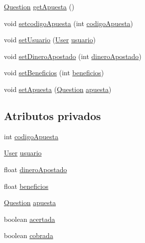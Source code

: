 \begin{DoxyCompactItemize}
\item 
\mbox{\hyperlink{classdomain_1_1Question}{Question}} \mbox{\hyperlink{classdomain_1_1Apuesta_aa9aa7f1a5d45ecec091814d68d4ab5c8}{get\+Apuesta}} ()
\item 
void \mbox{\hyperlink{classdomain_1_1Apuesta_ac6f9b493d59c2f2f26d6d1374913a0f4}{setcodigo\+Apuesta}} (int \mbox{\hyperlink{classdomain_1_1Apuesta_afa9c90fb9ef5b0e4e674c14e8897f73c}{codigo\+Apuesta}})
\item 
void \mbox{\hyperlink{classdomain_1_1Apuesta_a1efaf2e67d5395ed2ef056db4833e0da}{set\+Usuario}} (\mbox{\hyperlink{classdomain_1_1User}{User}} \mbox{\hyperlink{classdomain_1_1Apuesta_a0d23f0bdf469bdfe1731964cf451feef}{usuario}})
\item 
void \mbox{\hyperlink{classdomain_1_1Apuesta_a9eb68253373b08cadd232dcc0d2959a2}{set\+Dinero\+Apostado}} (int \mbox{\hyperlink{classdomain_1_1Apuesta_abad5a9f03d069677bfdcd8505fc9babb}{dinero\+Apostado}})
\item 
void \mbox{\hyperlink{classdomain_1_1Apuesta_a98a5d5593ba08e9cdf74857c501bc1ef}{set\+Beneficios}} (int \mbox{\hyperlink{classdomain_1_1Apuesta_acec50d5cb60237c9965be9f66d36e041}{beneficios}})
\item 
void \mbox{\hyperlink{classdomain_1_1Apuesta_add05d4c5b0aef4171628c2eaec38fe93}{set\+Apuesta}} (\mbox{\hyperlink{classdomain_1_1Question}{Question}} \mbox{\hyperlink{classdomain_1_1Apuesta_a43e71ee854e8e8b1447a707fc749d34b}{apuesta}})
\end{DoxyCompactItemize}
\subsection*{Atributos privados}
\begin{DoxyCompactItemize}
\item 
int \mbox{\hyperlink{classdomain_1_1Apuesta_afa9c90fb9ef5b0e4e674c14e8897f73c}{codigo\+Apuesta}}
\item 
\mbox{\hyperlink{classdomain_1_1User}{User}} \mbox{\hyperlink{classdomain_1_1Apuesta_a0d23f0bdf469bdfe1731964cf451feef}{usuario}}
\item 
float \mbox{\hyperlink{classdomain_1_1Apuesta_abad5a9f03d069677bfdcd8505fc9babb}{dinero\+Apostado}}
\item 
float \mbox{\hyperlink{classdomain_1_1Apuesta_acec50d5cb60237c9965be9f66d36e041}{beneficios}}
\item 
\mbox{\hyperlink{classdomain_1_1Question}{Question}} \mbox{\hyperlink{classdomain_1_1Apuesta_a43e71ee854e8e8b1447a707fc749d34b}{apuesta}}
\item 
boolean \mbox{\hyperlink{classdomain_1_1Apuesta_a8adfa2717f26eeac6e6b9df3985f3a57}{acertada}}
\item 
boolean \mbox{\hyperlink{classdomain_1_1Apuesta_a32769c4fa66a117a3728faf31056a7a9}{cobrada}}
\end{DoxyCompactItemize}


